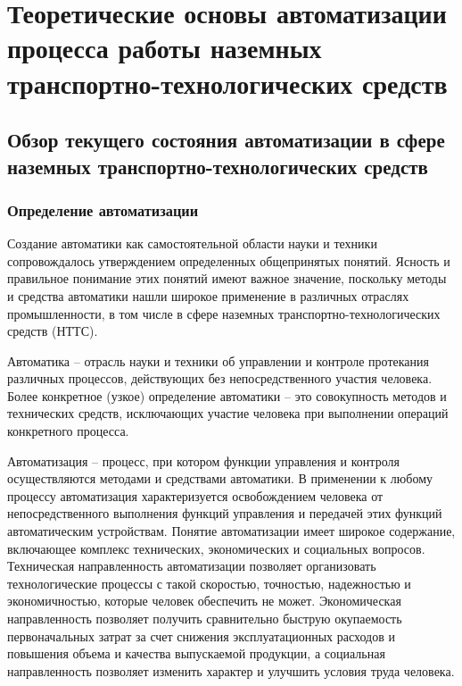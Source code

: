 \chapter{Теоретические основы автоматизации процесса работы наземных транспортно-технологических средств}\label{ch:ch1}

\section{Обзор текущего состояния автоматизации в сфере наземных транспортно-технологических средств}\label{sec:ch1/sec1}

\subsection{Определение автоматизации}\label{subsec:ch1/sec1/sub1}

Создание автоматики как самостоятельной области науки и техники сопровождалось утверждением определенных общепринятых понятий. Ясность и правильное понимание этих понятий имеют важное значение, поскольку методы и средства автоматики нашли широкое применение в различных отраслях промышленности, в том числе в сфере наземных транспортно-технологических средств (НТТС).

Автоматика -- отрасль науки и техники об управлении и контроле протекания различных процессов, действующих без непосредственного участия человека. Более конкретное (узкое) определение автоматики -- это совокупность методов и технических средств, исключающих участие человека при выполнении операций конкретного процесса.

Автоматизация -- процесс, при котором функции управления и контроля осуществляются методами и средствами автоматики. В применении к любому процессу автоматизация характеризуется освобождением человека от непосредственного выполнения функций управления и передачей этих функций автоматическим устройствам. Понятие автоматизации имеет широкое содержание, включающее комплекс технических, экономических и социальных вопросов. Техническая направленность автоматизации позволяет организовать технологические процессы с такой скоростью, точностью, надежностью и экономичностью, которые человек обеспечить не может. Экономическая направленность позволяет получить сравнительно быструю окупаемость первоначальных затрат за счет снижения эксплуатационных расходов и повышения объема и качества выпускаемой продукции, а социальная направленность позволяет изменить характер и улучшить условия труда человека.

